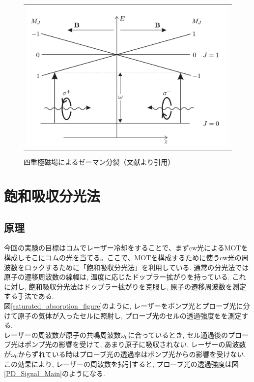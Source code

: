 \documentclass[uplatex, dvipdfmx, a4paper, report, papersize, 11pt]{jsbook}
\begin{document}
\begin{figure}[htpb]
\begin{tabular}{c}
      \begin{minipage}{0.50\hsize}
        \centering
          \includegraphics[keepaspectratio,  scale=0.40,  angle=0]
                          {figures/chapter2/MOT_zeeman_split.png}
                          \caption{四重極磁場によるゼーマン分裂（文献\cite{Foot:1080846}より引用）}
                          \label{MOT_zeeman_split}
      \end{minipage}


    \end{tabular}
\end{figure}

\newpage
\section{飽和吸収分光法}
\subsection{原理}
今回の実験の目標はコムでレーザー冷却をすることで、まずcw光によるMOTを構成しそこにコムの光を当てる。ここで、MOTを構成するために使うcw光の周波数をロックするために「飽和吸収分光法」を利用している. 通常の分光法では原子の遷移周波数の線幅は, 温度に応じたドップラー拡がりを持っている. これに対し, 飽和吸収分光法はドップラー拡がりを克服し, 原子の遷移周波数を測定する手法である. \\図\ref{saturated_absorption_figure}のように, レーザーをポンプ光とプローブ光に分けて原子の気体が入ったセルに照射し, プローブ光のセルの透過強度をを測定する.\\レーザーの周波数が原子の共鳴周波数$\omega_0$に合っているとき, セル通過後のプローブ光はポンプ光の影響を受けて, あまり原子に吸収されない. レーザーの周波数が$\omega_0$からずれている時はプローブ光の透過率はポンプ光からの影響を受けない. この効果により, レーザーの周波数を掃引すると, プローブ光の透過強度は図\ref{PD_Signal_Main}のようになる.\\
\end{document}
